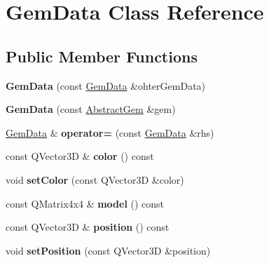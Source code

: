 \hypertarget{class_gem_data}{}\section{Gem\+Data Class Reference}
\label{class_gem_data}
\subsection*{Public Member Functions}
\begin{DoxyCompactItemize}
\item 
\hypertarget{class_gem_data_a384ba75fa94427e138d3f7240ffd2877}{}{\bfseries Gem\+Data} (const \hyperlink{class_gem_data}{Gem\+Data} \&ohter\+Gem\+Data)\label{class_gem_data_a384ba75fa94427e138d3f7240ffd2877}

\item 
\hypertarget{class_gem_data_aa2027a69a6c2719badb12e169ede4fa0}{}{\bfseries Gem\+Data} (const \hyperlink{class_abstract_gem}{Abstract\+Gem} \&gem)\label{class_gem_data_aa2027a69a6c2719badb12e169ede4fa0}

\item 
\hypertarget{class_gem_data_a736bacc522b569d04d40321b40cabc6a}{}\hyperlink{class_gem_data}{Gem\+Data} \& {\bfseries operator=} (const \hyperlink{class_gem_data}{Gem\+Data} \&rhs)\label{class_gem_data_a736bacc522b569d04d40321b40cabc6a}

\item 
\hypertarget{class_gem_data_af210f7380a31e39e1494629fb4f7b5d1}{}const Q\+Vector3\+D \& {\bfseries color} () const \label{class_gem_data_af210f7380a31e39e1494629fb4f7b5d1}

\item 
\hypertarget{class_gem_data_a08bf37ae1fa58d93146f10719c2fed41}{}void {\bfseries set\+Color} (const Q\+Vector3\+D \&color)\label{class_gem_data_a08bf37ae1fa58d93146f10719c2fed41}

\item 
\hypertarget{class_gem_data_acf4d522f8c4ef7dd30c184b73790a8fb}{}const Q\+Matrix4x4 \& {\bfseries model} () const \label{class_gem_data_acf4d522f8c4ef7dd30c184b73790a8fb}

\item 
\hypertarget{class_gem_data_aa863540bdd957405b632864da28908b2}{}const Q\+Vector3\+D \& {\bfseries position} () const \label{class_gem_data_aa863540bdd957405b632864da28908b2}

\item 
\hypertarget{class_gem_data_a6e1ea1cab5241f228842cd47b37202fa}{}void {\bfseries set\+Position} (const Q\+Vector3\+D \&position)\label{class_gem_data_a6e1ea1cab5241f228842cd47b37202fa}


\end{DoxyCompactItemize}
